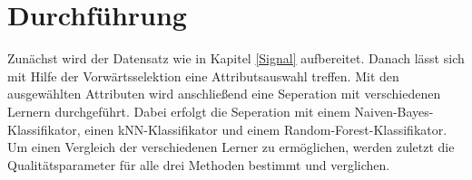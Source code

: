\section{Durchführung}
Zunächst wird der Datensatz wie in Kapitel \ref{Signal} aufbereitet. Danach lässt sich mit Hilfe der Vorwärtsselektion eine Attributsauswahl treffen. Mit den ausgewählten Attributen wird anschließend eine Seperation mit verschiedenen Lernern durchgeführt. Dabei erfolgt die Seperation mit einem Naiven-Bayes-Klassifikator, einen kNN-Klassifikator und einem Random-Forest-Klassifikator. \\
Um einen Vergleich der verschiedenen Lerner zu ermöglichen, werden zuletzt die Qualitätsparameter für alle drei Methoden bestimmt und verglichen.
